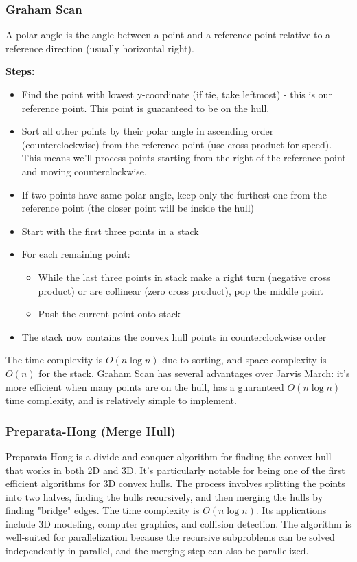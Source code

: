 \documentclass[11pt,a4paper]{article}
\begin{document}
\begin{multicols}{2}
\subsubsection{Graham Scan}
A polar angle is the angle between a point and a reference point relative to a reference direction (usually horizontal right).

\textbf{Steps:}
\begin{itemize}
    \item Find the point with lowest y-coordinate (if tie, take leftmost) - this is our reference point. This point is guaranteed to be on the hull.
    \item Sort all other points by their polar angle in ascending order (counterclockwise) from the reference point (use cross product for speed). This means we'll process points starting from the right of the reference point and moving counterclockwise.
    \item If two points have same polar angle, keep only the furthest one from the reference point (the closer point will be inside the hull)
    \item Start with the first three points in a stack
    \item For each remaining point:
    \begin{itemize}
        \item While the last three points in stack make a right turn (negative cross product) or are collinear (zero cross product), pop the middle point
        \item Push the current point onto stack
    \end{itemize}
    \item The stack now contains the convex hull points in counterclockwise order
\end{itemize}

The time complexity is $O(n \log n)$ due to sorting, and space complexity is $O(n)$ for the stack.
Graham Scan has several advantages over Jarvis March: it's more efficient when many points are on the hull, has a guaranteed $O(n \log n)$ time complexity, and is relatively simple to implement.

\subsubsection{Preparata-Hong (Merge Hull)}
Preparata-Hong is a divide-and-conquer algorithm for finding the convex hull that works in both 2D and 3D.
It's particularly notable for being one of the first efficient algorithms for 3D convex hulls.
The process involves splitting the points into two halves, finding the hulls recursively, and then merging the hulls by finding "bridge" edges. The time complexity is $O(n \log n)$.
Its applications include 3D modeling, computer graphics, and collision detection.
The algorithm is well-suited for parallelization because the recursive subproblems can be solved independently in parallel, and the merging step can also be parallelized.


\end{multicols}
\end{document}
